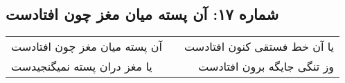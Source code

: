 \begin{center}
\section*{شماره ۱۷: آن پسته میان مغز چون افتادست}
\label{sec:017}
\begin{longtable}{l p{0.5cm} r}
آن پسته میان مغز چون افتادست
&&
یا آن خط فستقی کنون افتادست
\\
یا مغز دران پسته نمیگنجیدست
&&
وز تنگی جایگه برون افتادست
\\
\end{longtable}
\end{center}
